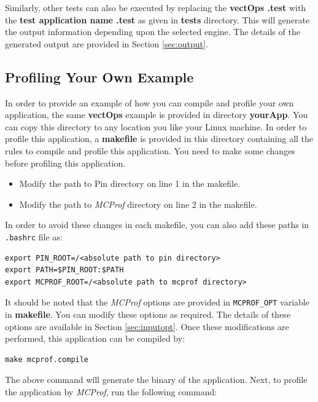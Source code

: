 \documentclass[11pt]{article}
\newcommand{\MCPROF}{\emph{MCProf}}
\begin{document}
Similarly, other tests can also be executed by replacing the
\textbf{\textlangle vectOps \textrangle.test} with the
\textbf{\textlangle test application name \textrangle.test} as
given in \textbf{tests} directory. This will generate the output information
depending upon the selected engine. The details of the generated output are
provided in Section \ref{sec:output}.

\subsection{Profiling Your Own Example}

In order to provide an example of how you can compile and profile your own
application, the same \textbf{vectOps} example is provided in directory
\textbf{yourApp}. You can copy this directory to any location you like your
Linux machine. In order to profile this application, a \textbf{makefile} is
provided in this directory containing all the rules to compile and profile this
application. You need to make some changes before profiling this application.

\begin{itemize}
\item Modify the path to Pin directory on line 1 in the makefile.
\item Modify the path to \MCPROF{} directory on line 2 in the makefile.
\end{itemize}

In order to avoid these changes in each makefile, you can also add these paths
in \verb|.bashrc| file as:

{
\small
\begin{Verbatim}[frame=single]
export PIN_ROOT=/<absolute path to pin directory>
export PATH=$PIN_ROOT:$PATH
export MCPROF_ROOT=/<absolute path to mcprof directory>
\end{Verbatim}
}

It should be noted that the \MCPROF{} options are provided in \verb|MCPROF_OPT|
variable in \textbf{makefile}. You can modify these options as required. The
details of these options are available in Section \ref{sec:inputopt}. Once these
modifications are performed, this application can be compiled by:

{
\small
\begin{Verbatim}[frame=single]
make mcprof.compile
\end{Verbatim}
}

The above command will generate the binary of the application. Next, to profile
the application by \MCPROF{}, run the following command:
\end{document}
